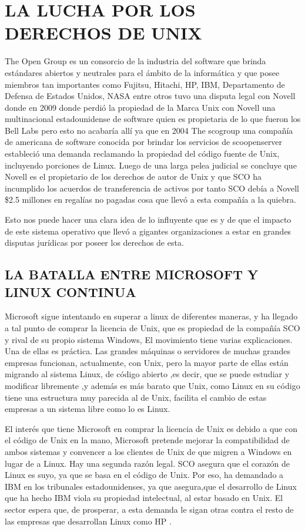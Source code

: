 \section*{LA LUCHA POR LOS DERECHOS DE UNIX}
The Open Group es un consorcio de la industria del software que brinda estándares abiertos y neutrales para el ámbito de la informática y que posee miembros tan importantes como 
Fujitsu, Hitachi, HP, IBM, Departamento de Defensa de Estados Unidos, NASA entre otros   tuvo  una disputa legal con  Novell donde en 2009 donde perdió la propiedad de la Marca 
Unix con Novell una multinacional estadounidense de software  quien es propietaria de lo que fueron los Bell Labs pero esto no acabaría allí  ya que en 2004 The scogroup una 
compañía de americana de software conocida por brindar los servicios de  scoopenserver estableció una demanda reclamando la propiedad del código fuente de Unix, incluyendo 
porciones de Linux. Luego de una larga pelea judicial se concluye que Novell es el propietario de los derechos de autor de Unix y que SCO  ha incumplido los acuerdos de 
transferencia de activos por tanto SCO debía a Novell \$2.5 millones en regalías no pagadas cosa que llevó a esta compañía a la quiebra.

Esto nos puede hacer una clara idea de lo influyente que es y de que el impacto de este sistema operativo que llevó a gigantes organizaciones a estar en grandes  disputas 
jurídicas por poseer los derechos de esta. 
 
\subsection*{LA BATALLA  ENTRE  MICROSOFT Y LINUX CONTINUA}
Microsoft sigue  intentando  en superar  a linux  de diferentes  maneras, y ha llegado  a  tal punto  de  comprar la  licencia  de  Unix,  que  es  propiedad  de  la  compañía 
SCO y  rival  de  su propio sistema  Windows, El movimiento tiene varias explicaciones. Una de ellas es práctica. Las grandes máquinas o servidores de muchas grandes empresas 
funcionan, actualmente, con Unix, pero la mayor parte de ellas están migrando al sistema Linux, de código abierto ,es decir, que se puede estudiar y modificar libremente ,y 
además es  más barato que Unix,  como Linux en su  código tiene una estructura muy parecida al de Unix, facilita el cambio  de  estas  empresas  a un sistema  libre  como lo  es  
Linux.

El interés  que tiene Microsoft  en comprar la licencia  de  Unix es debido a que  con el código de Unix en la mano, Microsoft pretende mejorar la compatibilidad de ambos 
sistemas y convencer a los clientes de Unix de que migren a Windows en lugar de a Linux.
Hay una segunda razón legal. SCO asegura que el corazón de Linux es suyo, ya que se basa en el código de Unix. Por eso, ha demandado a IBM en los tribunales estadounidenses, ya 
que asegura,que  el desarrollo de Linux que ha hecho IBM viola su propiedad intelectual, al estar basado en Unix. El sector espera que, de prosperar, a esta demanda le sigan 
otras contra el resto de las empresas que desarrollan Linux  como  HP .

